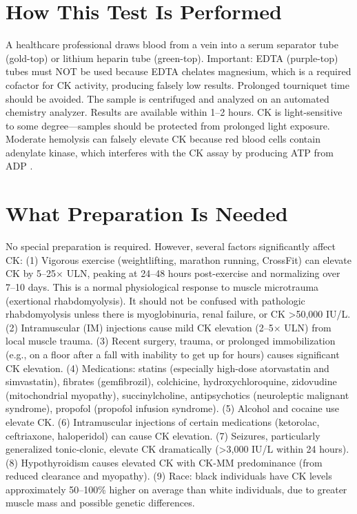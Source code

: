 \section*{How This Test Is Performed}
A healthcare professional draws blood from a vein into a serum separator tube (gold-top) or lithium heparin tube (green-top). Important: EDTA (purple-top) tubes must NOT be used because EDTA chelates magnesium, which is a required cofactor for CK activity, producing falsely low results. Prolonged tourniquet time should be avoided. The sample is centrifuged and analyzed on an automated chemistry analyzer. Results are available within 1--2 hours. CK is light-sensitive to some degree---samples should be protected from prolonged light exposure. Moderate hemolysis can falsely elevate CK because red blood cells contain adenylate kinase, which interferes with the CK assay by producing ATP from ADP \cite{wallach2022interpretation}.

\section*{What Preparation Is Needed}
No special preparation is required. However, several factors significantly affect CK: (1) Vigorous exercise (weightlifting, marathon running, CrossFit) can elevate CK by 5--25$\times$ ULN, peaking at 24--48 hours post-exercise and normalizing over 7--10 days. This is a normal physiological response to muscle microtrauma (exertional rhabdomyolysis). It should not be confused with pathologic rhabdomyolysis unless there is myoglobinuria, renal failure, or CK >50,000 IU/L. (2) Intramuscular (IM) injections cause mild CK elevation (2--5$\times$ ULN) from local muscle trauma. (3) Recent surgery, trauma, or prolonged immobilization (e.g., on a floor after a fall with inability to get up for hours) causes significant CK elevation. (4) Medications: statins (especially high-dose atorvastatin and simvastatin), fibrates (gemfibrozil), colchicine, hydroxychloroquine, zidovudine (mitochondrial myopathy), succinylcholine, antipsychotics (neuroleptic malignant syndrome), propofol (propofol infusion syndrome). (5) Alcohol and cocaine use elevate CK. (6) Intramuscular injections of certain medications (ketorolac, ceftriaxone, haloperidol) can cause CK elevation. (7) Seizures, particularly generalized tonic-clonic, elevate CK dramatically (>3,000 IU/L within 24 hours). (8) Hypothyroidism causes elevated CK with CK-MM predominance (from reduced clearance and myopathy). (9) Race: black individuals have CK levels approximately 50--100\% higher on average than white individuals, due to greater muscle mass and possible genetic differences.

